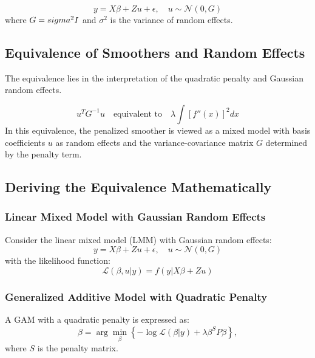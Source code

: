 \documentclass[12pt, twoside,hidelinks]{article}
\theoremstyle{definition}
\numberwithin{equation}{section}
\begin{document}
\begin{equation}
y = X\beta + Zu + \epsilon, \quad u \sim \mathcal{N}(0, G)
\label{eq:gaussian_random_effects}
\end{equation}
where \( G = \\sigma^2 I \) and \( \sigma^2 \) is the variance of random effects.

\subsection{Equivalence of Smoothers and Random Effects}
The equivalence lies in the interpretation of the quadratic penalty and Gaussian random effects.

\begin{equation}
    u^T G^{-1} u \quad \text{equivalent to} \quad \lambda \int [f''(x)]^2 dx
    \label{eq:equivalence}
\end{equation}
In this equivalence, the penalized smoother is viewed as a mixed model with basis coefficients \( u \) as random effects and the variance-covariance matrix \( G \) determined by the penalty term.

\subsection{Deriving the Equivalence Mathematically}

\subsubsection{Linear Mixed Model with Gaussian Random Effects}
Consider the linear mixed model (LMM) with Gaussian random effects:
\begin{equation}
y = X\beta + Zu + \epsilon, \quad u \sim \mathcal{N}(0, G)
\label{eq:lmm}
\end{equation}
with the likelihood function:
\begin{equation}
\mathcal{L}(\beta, u | y) = f(y | X\beta + Zu)
\label{eq:lmm_likelihood}
\end{equation}

\subsubsection{Generalized Additive Model with Quadratic Penalty}
A GAM with a quadratic penalty is expressed as:
\begin{equation}
\hat{\beta} = \arg\min_{\beta} \left\{ -\log \mathcal{L}(\beta | y) + \lambda \beta^S P \beta \right\},
\label{eq:gam_penalty}
\end{equation}
where \( S \) is the penalty matrix.
\end{document}
